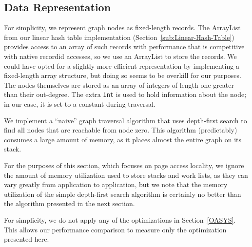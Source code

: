 \documentclass[10pt,letterpaper,twocolumn,english]{article}
\begin{document}
\subsection {Data Representation}

For simplicity, we represent graph nodes as
fixed-length records.  The ArrayList from our linear hash table
implementation (Section~\ref{sub:Linear-Hash-Table}) provides access to an
array of such records with performance that is competitive with native
recordid accesses, so we use an ArrayList to store the records.  We
could have opted for a slightly more efficient representation by
implementing a fixed-length array structure, but doing so seems to be
overkill for our purposes.  The nodes themselves are stored as an
array of integers of length one greater than their out-degree. The
extra {\tt int} is used to hold information about the node; in our case,
it is set to a constant during traversal.

We implement a ``naive'' graph traversal algorithm that uses depth-first search to find all nodes that are reachable from node zero.
This algorithm (predictably) consumes a large amount of memory, as
it places almost the entire graph on its stack.  

For the purposes of this section, which focuses on page access
locality, we ignore the amount of memory utilization used to store
stacks and work lists, as they can vary greatly from application to
application, but we note that the memory utilization of the simple
depth-first search algorithm is certainly no better than the algorithm
presented in the next section.

For simplicity, we do not apply any of the optimizations in
Section~\ref{OASYS}.  This allows our performance comparison to
 measure only the optimization presented here.
\end{document}
